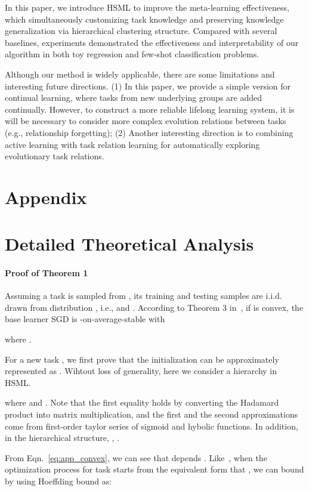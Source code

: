 \documentclass{article}
\begin{document}
In this paper, we introduce HSML to improve the meta-learning effectiveness, which simultaneously customizing task knowledge and preserving knowledge generalization via hierarchical clustering structure. Compared with several baselines, experiments demonstrated the effectiveness and interpretability of our algorithm in both toy regression and few-shot classification problems.

Although our method is widely applicable, there are some limitations and 
interesting 
future directions. (1) In this paper, we provide a simple version for continual learning, where tasks from new underlying groups are added continually. However, 
to construct a more reliable lifelong learning system, 
it is will be necessary to consider more complex evolution relations between tasks (e.g., relationship forgetting); (2) Another interesting direction is to combining active learning with task relation learning for automatically exploring evolutionary task relations. \clearpage
\onecolumn
\appendix
\section*{Appendix}
\section{Detailed Theoretical Analysis}
\paragraph{Proof of Theorem 1}
Assuming a task  is sampled from , its training and testing samples are i.i.d. drawn from distribution , i.e.,  and . According to Theorem 3 in~\cite{kuzborskij2017data}, if  is convex, the base learner  SGD is -on-average-stable with

where .

For a new task , we first prove that the initialization can be approximately represented as 
.
Wihtout loss of generality, here we consider a hierarchy  in HSML. 


where  and .
Note that the first equality holds by converting the Hadamard product into matrix multiplication, and the first and the second approximations come from first-order taylor series of sigmoid and hybolic functions. In addition, in the  hierarchical structure, , .


From Eqn.~\ref{eq:app_convex}, we can see that  depends . Like~\cite{kuzborskij2017data}, when the optimization process for task  starts from the equivalent form that , we can bound  by using Hoeffding bound as:
\end{document}
